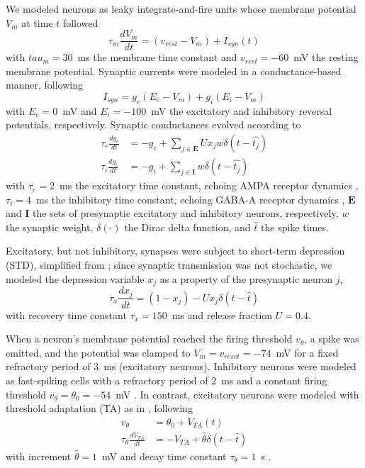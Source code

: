 \documentclass[pdflatex,referee,iicol,sn-basic]{sn-jnl}
\theoremstyle{thmstyleone}%
\theoremstyle{thmstyletwo}%
\theoremstyle{thmstylethree}%
\begin{document}
We modeled neurons as leaky integrate-and-fire units whose membrane potential $V_m$ at time $t$ followed
\begin{equation}
    \tau_m \frac{dV_m}{dt} = (v_{rest}-V_m) + I_{syn}(t)
\end{equation}
with $tau_m = 30$~ms the membrane time constant and $v_{rest} = -60$~mV the resting membrane potential. Synaptic currents were modeled in a conductance-based manner, following
\begin{equation}
    I_{syn} = g_e(E_e-V_m) + g_i(E_i-V_m)
\end{equation}
with $E_e = 0$~mV and $E_i = -100$~mV the excitatory and inhibitory reversal potentials, respectively. Synaptic conductances evolved according to
\begin{align} 
    \tau_e \frac{dg_e}{dt} &= -g_e + \sum_{j \in \boldsymbol E} U x_j w \delta(t - \hat{t_j}) \nonumber \\
    \tau_i \frac{dg_i}{dt} &= -g_i + \sum_{j \in \boldsymbol I} w \delta(t - \hat{t_j}) \label{eqn-gsyn}
\end{align}
with $\tau_e = 2$~ms the excitatory time constant, echoing AMPA receptor dynamics \citep{Hausser1997-cn}, $\tau_i = 4$~ms the inhibitory time constant, echoing GABA-A receptor dynamics \citep{Destexhe1994-oc}, $\boldsymbol E$ and $\boldsymbol I$ the sets of presynaptic excitatory and inhibitory neurons, respectively, $w$ the synaptic weight, $\delta(\cdot)$ the Dirac delta function, and $\hat{t}$ the spike times.

Excitatory, but not inhibitory, synapses were subject to short-term depression (STD), simplified from \cite{Tsodyks1997-qt}; since synaptic transmission was not stochastic, we modeled the depression variable $x_j$ as a property of the presynaptic neuron $j$,
\begin{equation}
    \tau_x \frac{dx_j}{dt} = (1-x_j) - U x_j \delta(t - \hat{t}) \label{eqn-xsyn}
\end{equation}
with recovery time constant $\tau_x = 150$~ms and release fraction $U = 0.4$.

When a neuron's membrane potential reached the firing threshold $v_\theta$, a spike was emitted, and the potential was clamped to $V_m = v_{reset} = -74$~mV for a fixed refractory period of 3~ms (excitatory neurons). Inhibitory neurons were modeled as fast-spiking cells with a refractory period of 2~ms and a constant firing threshold $v_\theta = \theta_0 = -54$~mV . In contrast, excitatory neurons were modeled with threshold adaptation (TA) as in \cite{Teeter2018-iz}, following
\begin{align}
    v_\theta &= \theta_0 + V_{TA}(t) \nonumber \\
    \tau_{\theta} \frac{dV_{TA}}{dt} &= -V_{TA} + \hat{\theta} \delta(t - \hat{t}) \label{eqn-TA}
\end{align}
with increment $\hat{\theta} = 1$~mV and decay time constant $\tau_{\theta} = 1$~s .
\end{document}
